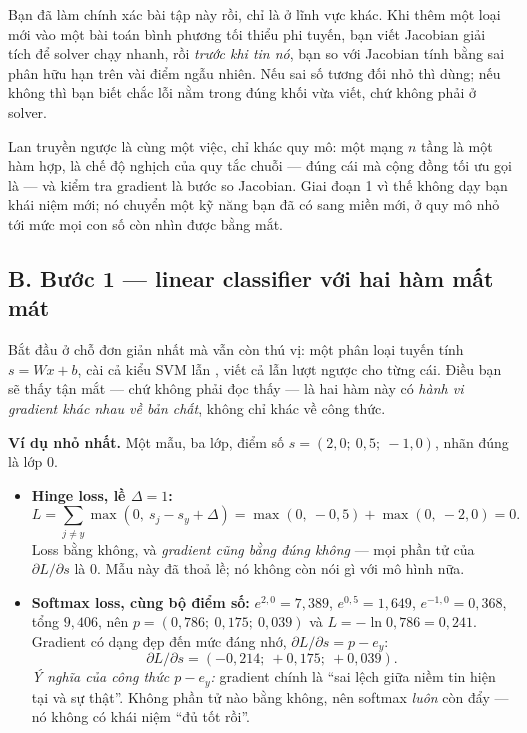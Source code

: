 \documentclass[../../../deep_learning.tex]{subfiles}
\begin{document}
\begin{trucgiac}
Bạn đã làm chính xác bài tập này rồi, chỉ là ở lĩnh vực khác. Khi thêm một loại  mới vào một bài toán bình phương tối thiểu phi tuyến, bạn viết Jacobian giải tích để solver chạy nhanh, rồi \emph{trước khi tin nó}, bạn so với Jacobian tính bằng sai phân hữu hạn trên vài điểm ngẫu nhiên. Nếu sai số tương đối nhỏ thì dùng; nếu không thì bạn biết chắc lỗi nằm trong đúng khối vừa viết, chứ không phải ở solver.

Lan truyền ngược là cùng một việc, chỉ khác quy mô: một mạng $n$ tầng là một hàm hợp,  là chế độ nghịch của quy tắc chuỗi --- đúng cái mà cộng đồng tối ưu gọi là  --- và kiểm tra gradient là bước so Jacobian. Giai đoạn 1 vì thế không dạy bạn khái niệm mới; nó chuyển một kỹ năng bạn đã có sang miền mới, ở quy mô nhỏ tới mức mọi con số còn nhìn được bằng mắt.
\end{trucgiac}

\subsection{B. Bước 1 --- linear classifier với hai hàm mất mát}
Bắt đầu ở chỗ đơn giản nhất mà vẫn còn thú vị: một phân loại tuyến tính $s = Wx + b$, cài cả  kiểu SVM lẫn , viết cả  lẫn lượt ngược cho từng cái. Điều bạn sẽ thấy tận mắt --- chứ không phải đọc thấy --- là hai hàm này có \emph{hành vi gradient khác nhau về bản chất}, không chỉ khác về công thức.

\textbf{Ví dụ nhỏ nhất.} Một mẫu, ba lớp, điểm số $s = (2{,}0;\ 0{,}5;\ -1{,}0)$, nhãn đúng là lớp 0.

\begin{itemize}
\item \textbf{Hinge loss, lề $\Delta = 1$:}
\[
L = \sum_{j \neq y} \max\!\left(0,\ s_j - s_y + \Delta\right) = \max(0,\ -0{,}5) + \max(0,\ -2{,}0) = 0 .
\]
Loss bằng không, và \emph{gradient cũng bằng đúng không} --- mọi phần tử của $\partial L/\partial s$ là 0. Mẫu này đã thoả lề; nó không còn nói gì với mô hình nữa.

\item \textbf{Softmax loss, cùng bộ điểm số:} $e^{2{,}0} = 7{,}389$, $e^{0{,}5} = 1{,}649$, $e^{-1{,}0} = 0{,}368$, tổng $9{,}406$, nên $p = (0{,}786;\ 0{,}175;\ 0{,}039)$ và $L = -\ln 0{,}786 = 0{,}241$. Gradient có dạng đẹp đến mức đáng nhớ, $\partial L/\partial s = p - e_y$:
\[
\partial L/\partial s = (-0{,}214;\ +0{,}175;\ +0{,}039).
\]
\emph{Ý nghĩa của công thức $p - e_y$:} gradient chính là ``sai lệch giữa niềm tin hiện tại và sự thật''. Không phần tử nào bằng không, nên softmax \emph{luôn} còn đẩy --- nó không có khái niệm ``đủ tốt rồi''.
\end{itemize}
\end{document}
